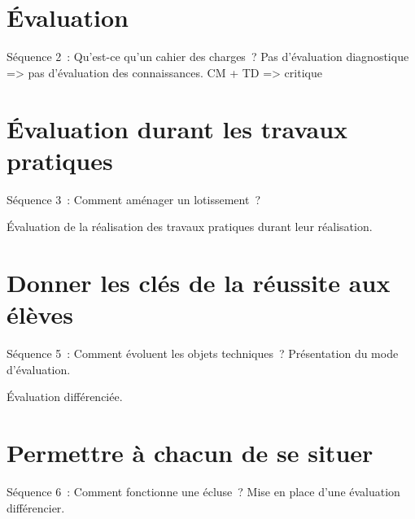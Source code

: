
\section{Évaluation }
Séquence 2~: Qu'est-ce qu'un cahier des charges~?
Pas d'évaluation diagnostique => pas d'évaluation des connaissances.
CM + TD => critique


\section{Évaluation durant les travaux pratiques}
Séquence 3~: Comment aménager un lotissement~?

Évaluation de la réalisation des travaux pratiques durant leur réalisation.


\section{Donner les clés de la réussite aux élèves }
Séquence 5~: Comment évoluent les objets techniques~?
Présentation du mode d'évaluation.

Évaluation différenciée.


\section{Permettre à chacun de se situer }
Séquence 6~: Comment fonctionne une écluse~?
Mise en place d'une évaluation différencier.




